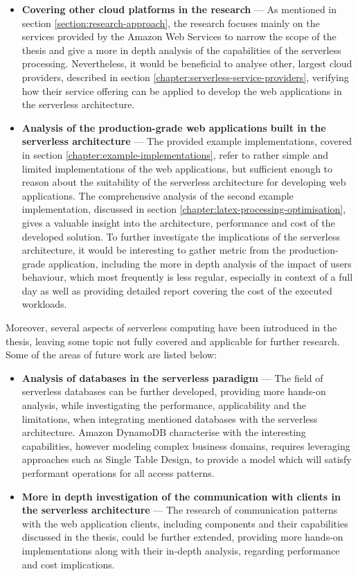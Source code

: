 \begin{itemize}
   \item \textbf{Covering other cloud platforms in the research} ---
   As mentioned in section \ref{section:research-approach}, the research focuses mainly on the services provided by the Amazon Web Services to narrow the scope of the thesis and give a more in depth analysis of the capabilities of the serverless processing.
   Nevertheless, it would be beneficial to analyse other, largest cloud providers, described in section \ref{chapter:serverless-service-providers}, verifying how their service offering can be applied to develop the web applications in the serverless architecture.
   \item \textbf{Analysis of the production-grade web applications built in the serverless architecture} ---
   The provided example implementations, covered in section \ref{chapter:example-implementations}, refer to rather simple and limited implementations of the web applications, but sufficient enough to reason about the suitability of the serverless architecture for developing web applications.
   The comprehensive analysis of the second example implementation, discussed in section \ref{chapter:latex-processing-optimisation}, gives a valuable insight into the architecture, performance and cost of the developed solution.
   To further investigate the implications of the serverless architecture, it would be interesting to gather metric from the production-grade application, including the more in depth analysis of the impact of users behaviour, which most frequently is less regular, especially in context of a full day as well as providing detailed report covering the cost of the executed workloads.
\end{itemize}

Moreover, several aspects of serverless computing have been introduced in the thesis, leaving some topic not fully covered and applicable for further research.
Some of the areas of future work are listed below:

\begin{itemize}
   \item \textbf{Analysis of databases in the serverless paradigm} ---
   The field of serverless databases can be further developed, providing more hands-on analysis, while investigating the performance, applicability and the limitations, when integrating mentioned databases with the serverless architecture.
   Amazon DynamoDB characterise with the interesting capabilities, however modeling complex business domains, requires leveraging approaches such as Single Table Design, to provide a model which will satisfy performant operations for all access patterns.
   \item \textbf{More in depth investigation of the communication with clients in the serverless architecture} ---
   The research of communication patterns with the web application clients, including components and their capabilities discussed in the thesis, could be further extended, providing more hands-on implementations along with their in-depth analysis, regarding performance and cost implications.
\end{itemize}

